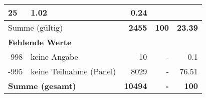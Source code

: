 \begin{longtable}{lXrrr}
       \num{25} &
       \num[round-mode=places,round-precision=2]{1,02} &
         \num[round-mode=places,round-precision=2]{0,24} \\
     \midrule
     \multicolumn{2}{l}{Summe (gültig)} &
       \textbf{\num{2455}} &
     \textbf{100} &
       \textbf{\num[round-mode=places,round-precision=2]{23,39}} \\
     \multicolumn{5}{l}{\textbf{Fehlende Werte}}\\
       -998 &
       keine Angabe &
         \num{10} &
        - &
         \num[round-mode=places,round-precision=2]{0,1} \\
       -995 &
       keine Teilnahme (Panel) &
         \num{8029} &
        - &
         \num[round-mode=places,round-precision=2]{76,51} \\
     \midrule
     \multicolumn{2}{l}{\textbf{Summe (gesamt)}} &
          \textbf{\num{10494}} &
        \textbf{-} &
        \textbf{100} \\
     \bottomrule
     \end{longtable}
     
